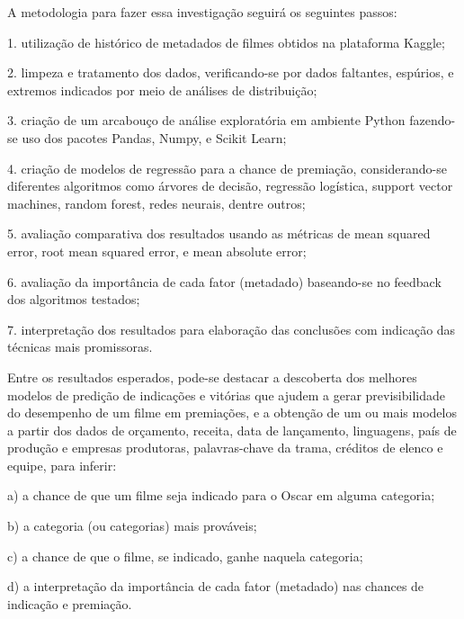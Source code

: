 A metodologia para fazer essa investigação seguirá os seguintes passos:\par

1. utilização de histórico de metadados de filmes obtidos na plataforma Kaggle;\par
2. limpeza e tratamento dos dados, verificando-se por dados faltantes, espúrios, e extremos indicados por meio de análises de distribuição;\par
3. criação de um arcabouço de análise exploratória em ambiente Python fazendo-se uso dos pacotes Pandas, Numpy, e Scikit Learn;\par
4. criação de modelos de regressão para a chance de premiação, considerando-se diferentes algoritmos como árvores de decisão, regressão logística, support vector machines, random forest, redes neurais, dentre outros;\par
5. avaliação comparativa dos resultados usando as métricas de mean squared error, root mean squared error, e mean absolute error;\par
6. avaliação da importância de cada fator (metadado) baseando-se no feedback dos algoritmos testados;\par
7. interpretação dos resultados para elaboração das conclusões com indicação das técnicas mais promissoras.\par
\par

Entre os resultados esperados, pode-se destacar a descoberta dos melhores modelos de predição de indicações e vitórias que ajudem a gerar previsibilidade do desempenho de um filme em premiações, e a obtenção de um ou mais modelos a partir dos dados de orçamento, receita, data de lançamento, linguagens, país de produção e empresas produtoras, palavras-chave da trama, créditos de elenco e equipe, para inferir:\par

a) a chance de que um filme seja indicado para o Oscar em alguma categoria;\par
b) a categoria (ou categorias) mais prováveis;\par
c) a chance de que o filme, se indicado, ganhe naquela categoria;\par
d) a interpretação da importância de cada fator (metadado) nas chances de indicação e premiação.\par
